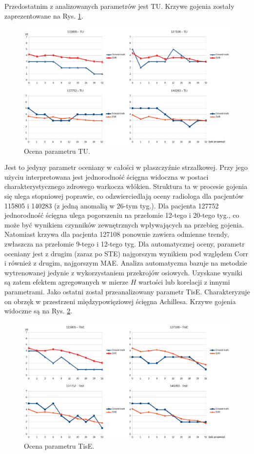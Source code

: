 Przedostatnim z analizowanych parametrów jest TU. Krzywe gojenia zostały zaprezentowane na Rys. \ref{fig:TU}.  
\begin{figure}[h!]
	\centering
	\includegraphics[width=1\textwidth]{figures/TU.png}
	\caption{Ocena parametru TU.}\label{fig:TU}
\end{figure}
Jest to jedyny parametr oceniany w całości w płaszczyźnie strzałkowej. Przy jego użyciu interpretowana jest jednorodność ścięgna widoczna w postaci charakterystycznego zdrowego warkocza włókien. Struktura \linebreak ta w procesie gojenia się ulega stopniowej poprawie, co odzwierciedlają oceny radiologa dla pacjentów 115805 i 140283 (z jedną anomalią w 26-tym tyg.). Dla pacjenta 127752 jednorodność ścięgna ulega pogorszeniu na przełomie 12-tego i 20-tego tyg., co może być wynikiem czynników zewnętrznych wpływających na przebieg gojenia. Natomiast krzywa dla pacjenta 127108 ponownie zawiera odmienne trendy, zwłaszcza na przełomie 9-tego i 12-tego tyg. Dla automatycznej oceny, parametr oceniany jest z drugim (zaraz po STE) najgorszym wynikiem pod względem Corr i również \linebreak z drugim, najgorszym MAE. Analiza automatyczna bazuje na metodzie wytrenowanej jedynie z wykorzystaniem przekrojów osiowych. Uzyskane wyniki są zatem efektem agregowanych w mierze $H$ wartości lub korelacji z innymi parametrami. 
\newpage
Jako ostatni został przeanalizowany parametr TisE. Charakteryzuje on obrzęk \linebreak w przestrzeni międzypowięziowej ścięgna Achillesa. Krzywe gojenia widoczne \linebreak są na Rys. \ref{fig:TisE}.
\begin{figure}[h!]
	\centering
	\includegraphics[width=1\textwidth]{figures/TisE.png}
	\caption{Ocena parametru TisE.}\label{fig:TisE}
\end{figure}
